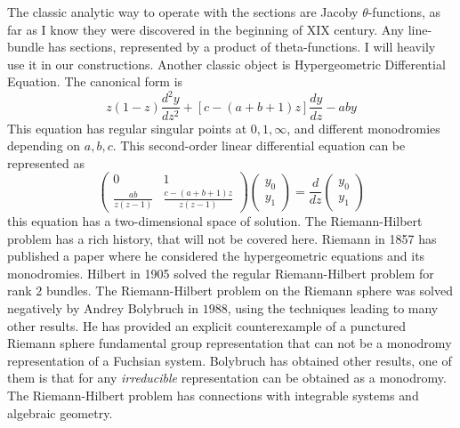 \documentclass[../main.tex]{subfiles}
\begin{document}
    The classic analytic way to operate with the sections are
    Jacoby $\theta$-functions, as far as I know they
    were discovered in the beginning of XIX century.
    Any line-bundle has sections, represented by a product of theta-functions.
    I will heavily use it in our constructions.
    Another classic object is Hypergeometric Differential Equation.
    The canonical form is
    \[ z(1-z) \frac{d^2y}{dz^2} + [c-(a+b+1)z] \frac{dy}{dz} - aby\]
    This equation has regular singular points at $0,1, \infty$, and different
    monodromies depending on $a,b,c$.
    This second-order linear differential equation can be represented as
    \begin{equation}
        \begin{pmatrix}
            0 & 1 \\
            \frac{ab}{z(z-1)} & \frac{c - (a+b+1)z}{z(z-1)} 

        \end{pmatrix}  \begin{pmatrix} y_0 \\ y_1 
                           \end{pmatrix} = \frac{d}{dz} \begin{pmatrix} y_0 \\ y_1
                                               \end{pmatrix}
    \end{equation}
        this equation has a two-dimensional space of solution.
        The Riemann-Hilbert problem has a rich history, that will not be covered here.
        Riemann in 1857 has published a paper where he considered the hypergeometric
    equations and its monodromies.
        Hilbert in 1905 solved the regular Riemann-Hilbert problem
        for rank $2$ bundles.
        The Riemann-Hilbert problem on the Riemann
        sphere was solved negatively by Andrey Bolybruch in $1988$,
        using the techniques leading to many other results. \cite{Ilyashenko08lectureson}
    He has provided an explicit counterexample of a punctured Riemann sphere fundamental
    group representation that can not be a monodromy
    representation of a Fuchsian system.
    Bolybruch has obtained other results, one of them is that for
    any \textit{irreducible} representation can be obtained as a monodromy.
    The Riemann-Hilbert problem has connections with integrable systems \cite{fokas1991} and
    algebraic geometry.
\end{document}
